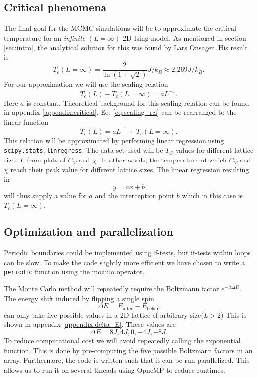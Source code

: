 \documentclass[english,notitlepage,reprint,nofootinbib]{revtex4-1}  %
\begin{document}
\subsection*{Critical phenomena}
The final goal for the MCMC simulations will be to approximate the critical temperature for an \textit{infinite} $(L=\infty)$ 2D Ising model. As mentioned in section \ref{sec:intro}, the analytical solution for this was found by Lars Onsager. His result is
\begin{equation*}
    T_c(L=\infty) = \frac{2}{\ln(1+\sqrt{2})}J/k_B \approx 2.269 J/k_B.
\end{equation*}
For our approximation we will use the scaling relation
\begin{equation}
    T_c(L) -T_c(L=\infty) = aL^{-1}. \label{eq:scaling_rel}
\end{equation}
Here $a$ is constant. Theoretical background for this scaling relation can be found in appendix \ref{appendix:critical}. Eq. \ref{eq:scaling_rel} can be rearranged to the linear function
\begin{equation}
    T_c(L) = aL^{-1} + T_c(L=\infty). \label{eq:scaling_linear}
\end{equation}
This relation will be approximated by performing linear regression using \texttt{scipy.stats.linregress}. The data set used will be $T_C$ values for different lattice sizes $L$ from plots of $C_V$ and $\chi$. In other words, the temperature at which $C_V$ and $\chi$ reach their peak value for different lattice sizes. The linear regression resulting in
\begin{equation}
    y = ax + b 
\end{equation}
will thus supply a value for $a$ and the interception point $b$ which in this case is $T_c(L=\infty)$.

\subsection*{Optimization and parallelization}
Periodic boundaries could be implemented using if-tests, but if-tests within loops can be slow. To make the code slightly more efficient we have chosen to write a \texttt{periodic} function using the modulo operator.

The Monte Carlo method will repeatedly require the Boltzmann factor $e^{-\beta \Delta E}$. The energy shift induced by flipping a single spin 
\begin{equation}
    \Delta E = E_{\text{after}} - E_{\text{before}}
\end{equation}
can only take five possible values in a 2D-lattice of arbitrary size($L > 2$) This is shown in appendix \ref{appendix:delta_E}. These values are
\begin{equation}
    \Delta E = 8J, 4J, 0, -4J, -8J.
\end{equation}
To reduce computational cost we will avoid repeatedly calling the exponential function. This is done by pre-computing the five possible Boltzmann factors in an array.
Furthermore, the code is written such that it can be run parallelized. This allows us to run it on several threads using OpneMP to reduce runtimes.
\end{document}
